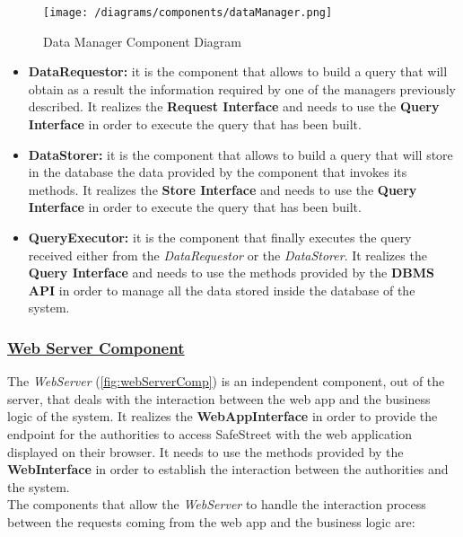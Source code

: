 			\begin{figure}[ht]
				\centering
				\texttt{[image: /diagrams/components/dataManager.png]}
				\caption{\label{fig:dataManagerComp} Data Manager Component Diagram}
			\end{figure}
		
			\begin{itemize}
				\item \textbf{DataRequestor:} it is the component that allows to build a query that will obtain as a result the information required by one of the managers previously described. It realizes the \textbf{Request Interface} and needs to use the \textbf{Query Interface} in order to execute the query that has been built.
				
				\item \textbf{DataStorer:} it is the component that allows to build a query that will store in the database the data provided by the component that invokes its methods. It realizes the \textbf{Store Interface} and needs to use the \textbf{Query Interface} in order to execute the query that has been built.
				
				\item \textbf{QueryExecutor:} it is the component that finally executes the query received either from the \emph{DataRequestor} or the \emph{DataStorer}. It realizes the \textbf{Query Interface} and needs to use the methods provided by the \textbf{DBMS API} in order to manage all the data stored inside the database of the system.
			\end{itemize}
		
		\subsubsection[Web Server Component]{\hyperlink{toc}{Web Server Component}}
			\label{sec:webServerComponent}
			
			The \emph{WebServer} (\autoref{fig:webServerComp}) is an independent component, out of the server, that deals with the interaction between the web app and the business logic of the system. It realizes the \textbf{WebAppInterface} in order to provide the endpoint for the authorities to access SafeStreet with the web application displayed on their browser. It needs to use the methods provided by the \textbf{WebInterface} in order to establish the interaction between the authorities and the system.\\
			
			The components that allow the \emph{WebServer} to handle the interaction process between the requests coming from the web app and the business logic are:
			
